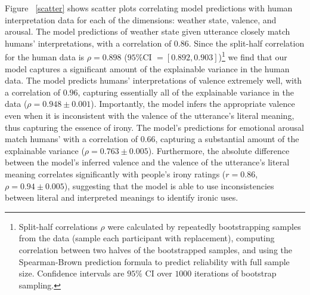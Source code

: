 \documentclass[10pt,letterpaper]{article}
\begin{document}
Figure ~\ref{scatter} shows scatter plots correlating model predictions with human interpretation data for each of the dimensions: weather state, valence, and arousal. %
The model predictions of weather state given utterance closely match humans' interpretations, with a correlation of $0.86$. Since the split-half correlation for the human data is $\rho=0.898$ ($95\%$CI $= [0.892, 0.903]$)\footnote{Split-half correlations $\rho$ were calculated by repeatedly bootstrapping samples from the data (sample each participant with replacement), computing correlation between two halves of the bootstrapped samples, and using the Spearman-Brown prediction formula to predict reliability with full sample size. Confidence intervals are $95\%$ CI over $1000$ iterations of bootstrap sampling.}  we find that our model captures a significant amount of the explainable variance in the human data. The model predicts humans' interpretations of valence extremely well, with a correlation of $0.96$, capturing essentially all of the explainable variance in the data ($\rho = 0.948\pm0.001$).
Importantly, the model infers the appropriate valence even when it is inconsistent with the valence of the utterance's literal meaning, thus capturing the essence of irony. 
The model's predictions for emotional arousal match humans' with a correlation of $0.66$, capturing a substantial amount of the explainable variance ($\rho = 0.763\pm0.005$). Furthermore, the absolute difference between the model's inferred valence and the valence of the utterance's literal meaning correlates significantly with people's irony ratings ($r = 0.86$, $\rho=0.94 \pm 0.005$), suggesting that the model is able to use inconsistencies between literal and interpreted meanings to identify ironic uses.
\end{document}
